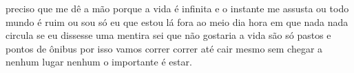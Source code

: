\begin{poem}
\begin{stanza}
preciso que me dê a mão\verseline
porque a vida é infinita\verseline
e o instante me assusta\verseline
\qquad ou todo mundo é ruim\verseline
\qquad ou sou só eu\verseline
que estou lá fora\verseline
ao meio dia\verseline
hora em que nada\verseline
nada circula\verseline
\qquad se eu dissesse\verseline
\qquad uma mentira\verseline
\qquad sei que não gostaria\verseline
a vida são só pastos\verseline
e pontos de ônibus\verseline
\qquad por isso vamos\verseline
\qquad correr correr\verseline
\qquad até cair\verseline
mesmo sem chegar\verseline
a nenhum lugar nenhum\verseline
\qquad o importante\verseline
\qquad é estar.
\end{stanza}
\end{poem}